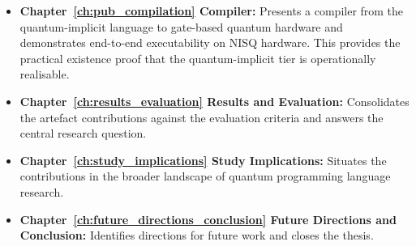 \begin{itemize}
    \item \textbf{Chapter~\ref{ch:pub_compilation} Compiler:}
    Presents a compiler from the quantum-implicit language to gate-based quantum hardware and demonstrates end-to-end executability on NISQ hardware.
    This provides the practical existence proof that the quantum-implicit tier is operationally realisable.

    \item \textbf{Chapter~\ref{ch:results_evaluation} Results and Evaluation:}
    Consolidates the artefact contributions against the evaluation criteria and answers the central research question.

    \item \textbf{Chapter~\ref{ch:study_implications} Study Implications:}
    Situates the contributions in the broader landscape of quantum programming language research.

    \item \textbf{Chapter~\ref{ch:future_directions_conclusion} Future Directions and Conclusion:}
    Identifies directions for future work and closes the thesis.

\end{itemize}